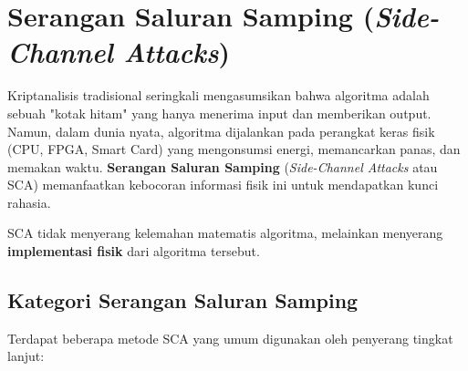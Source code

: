 \section{Serangan Saluran Samping (\textit{Side-Channel Attacks})}

Kriptanalisis tradisional seringkali mengasumsikan bahwa algoritma adalah sebuah "kotak hitam" yang hanya menerima input dan memberikan output. Namun, dalam dunia nyata, algoritma dijalankan pada perangkat keras fisik (CPU, FPGA, Smart Card) yang mengonsumsi energi, memancarkan panas, dan memakan waktu. \textbf{Serangan Saluran Samping} (\textit{Side-Channel Attacks} atau SCA) memanfaatkan kebocoran informasi fisik ini untuk mendapatkan kunci rahasia.

SCA tidak menyerang kelemahan matematis algoritma, melainkan menyerang \textbf{implementasi fisik} dari algoritma tersebut.

\subsection{Kategori Serangan Saluran Samping}

Terdapat beberapa metode SCA yang umum digunakan oleh penyerang tingkat lanjut:

